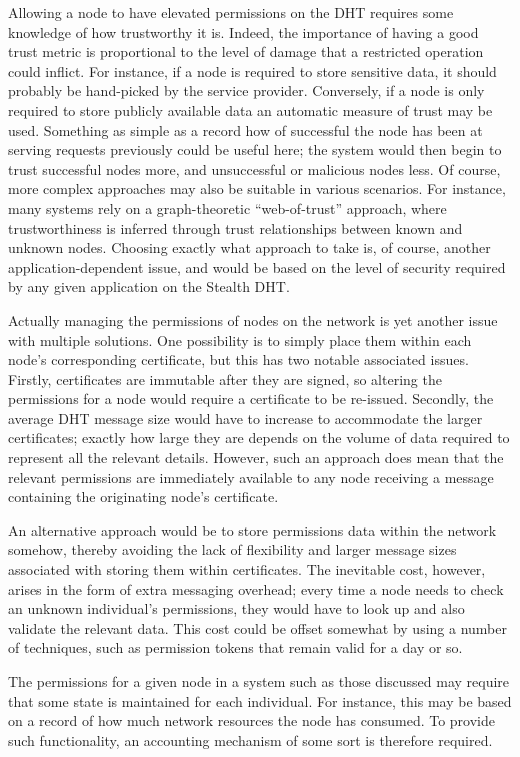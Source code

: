 \documentclass{elsart3p}
\begin{document}
Allowing a node to have elevated permissions on the DHT requires
some knowledge of how trustworthy it is. Indeed, the importance of
having a good trust metric is proportional to the level of damage
that a restricted operation could inflict. For instance, if a node
is required to store sensitive data, it should probably be
hand-picked by the service provider. Conversely, if a node is only
required to store publicly available data an
automatic measure of trust may be used. Something as simple
as a record how of successful the node has been at serving requests
previously could be useful here; the system would then begin to
trust successful nodes more, and unsuccessful or malicious nodes
less. Of course, more complex approaches may also be suitable in
various scenarios. For instance, many systems rely on a
graph-theoretic ``web-of-trust'' approach, where trustworthiness is
inferred through trust relationships between known
and unknown nodes. Choosing exactly what approach to take is, of
course, another application-dependent issue, and would be based on
the level of security required by any given application on the
Stealth DHT.

Actually managing the permissions of nodes on the network is yet
another issue with multiple solutions. One possibility is to simply
place them within each node's corresponding certificate, but this
has two notable associated issues. Firstly, certificates are
immutable after they are signed, so altering the permissions for a
node would require a certificate to be re-issued. Secondly, the
average DHT message size would have to increase to accommodate the
larger certificates; exactly how large they are depends on the
volume of data required to represent all the relevant details.
However, such an approach does mean that the relevant permissions
are immediately available to any node receiving a message containing
the originating node's certificate.

An alternative approach would be to store permissions data within
the network somehow, thereby avoiding the lack of flexibility and
larger message sizes associated with storing them within
certificates. The inevitable cost, however, arises in the form of
extra messaging overhead; every time a node needs to check an
unknown individual's permissions, they would have to look up and
also validate the relevant data. This cost could be offset somewhat
by using a number of techniques, such as permission tokens that remain valid
for a day or so.

The permissions for a given node in a system such as those discussed
may require that some state is maintained for each individual. For
instance, this may be based on a record of how much network
resources the node has consumed. To provide such functionality, an
accounting mechanism of some sort is therefore required.
\end{document}
